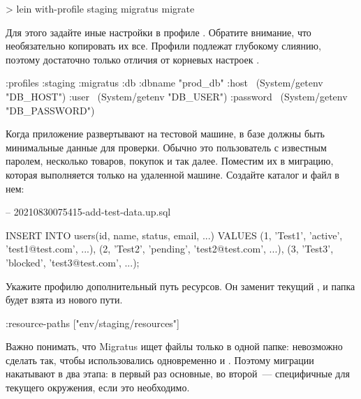 \begin{english}
  \begin{bash}
> lein with-profile staging migratus migrate
  \end{bash}
\end{english}

Для этого задайте иные настройки  в профиле . Обратите внимание, что необязательно копировать их все. Профили  подлежат глубокому слиянию, поэтому достаточно только отличия от корневых настроек .

\begin{english}
  \begin{clojure}
{:profiles
 {:staging
  {:migratus
   {:db {:dbname "prod_db"
         :host ~(System/getenv "DB_HOST")
         :user ~(System/getenv "DB_USER")
         :password ~(System/getenv "DB_PASSWORD")}}}}}
  \end{clojure}
\end{english}

Когда приложение развертывают на тестовой машине, в базе должны быть минимальные данные для проверки. Обычно это пользователь с известным паролем, несколько товаров, покупок и так далее. Поместим их в миграцию, которая выполняется только на удаленной машине. Создайте каталог  и файл в нем:

\begin{english}
  \begin{sql}
-- 20210830075415-add-test-data.up.sql

INSERT INTO users(id, name, status, email, ...)
VALUES
 (1, 'Test1', 'active',  'test1@test.com', ...),
 (2, 'Test2', 'pending', 'test2@test.com', ...),
 (3, 'Test3', 'blocked', 'test3@test.com', ...);
  \end{sql}
\end{english}

Укажите профилю  дополнительный путь ресурсов. Он заменит текущий , и папка  будет взята из нового пути.

\begin{english}
  \begin{clojure}
{:resource-paths ["env/staging/resources"]}
  \end{clojure}
\end{english}

Важно понимать, что Migratus ищет файлы только в одной папке: невозможно сделать так, чтобы использовались одновременно  и . Поэтому миграции накатывают в два этапа: в первый раз основные, во второй~--- специфичные для текущего окружения, если это необходимо.

